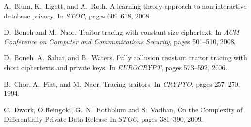\documentclass{sig-alternate}
\begin{document}
\begin{thebibliography}{10}
\vskip 0.1in
A.~Blum, K.~Ligett, and A.~Roth.
\newblock A learning theory approach to non-interactive database privacy.
\newblock In {\em STOC}, pages 609--618, 2008.

D.~Boneh and M.~Naor.
\newblock Traitor tracing with constant size ciphertext.
\newblock In {\em ACM Conference on Computer and Communications Security},
  pages 501--510, 2008.

D.~Boneh, A.~Sahai, and B.~Waters.
\newblock Fully collusion resistant traitor tracing with short ciphertexts and
  private keys.
\newblock In {\em EUROCRYPT}, pages 573--592, 2006.

B.~Chor, A.~Fiat, and M.~Naor.
\newblock Tracing traitors.
\newblock In {\em CRYPTO}, pages 257--270, 1994.

C.~Dwork, O.\~Reingold, G.~N.~Rothblum and S.~Vadhan, 
\newblock On the Complexity of Differentially Private Data Release
\newblock In {\em STOC}, pages 381--390, 2009.

\end{thebibliography}
\end{document}
